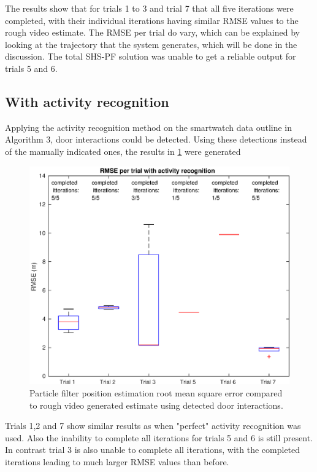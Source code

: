 The results show that for trials 1 to 3 and trial 7 that all five iterations were completed, with their individual iterations having similar RMSE values to the rough video estimate. The RMSE per trial do vary, which can be explained by looking at the trajectory that the system generates, which will be done in the discussion. The total SHS-PF solution was unable to get a reliable output for trials 5 and 6.\par 
\newpage
\subsection{With activity recognition}

Applying the activity recognition method on the smartwatch data outline in Algorithm 3, door interactions could be detected. Using these detections instead of the manually indicated ones, the results in \cref{fig:rmse_per_trial_with_activity_recognition} were generated

\begin{figure}[H]
	\centering
	\includegraphics[width=0.7\linewidth]{images/20201118_1211_RMSE_per_trial_with_activity_recognition}
	\caption[Particle Filter position estimation performance with door interaction]{Particle filter position estimation root mean square error compared to rough video generated estimate using detected door interactions.}
	\label{fig:rmse_per_trial_with_activity_recognition}
\end{figure}

Trials 1,2 and 7 show similar results as when "perfect" activity recognition was used. Also the inability to complete all iterations for trials 5 and 6 is still present. In contrast trial 3 is also unable to complete all iterations, with the completed iterations leading to much larger RMSE values than before. 

